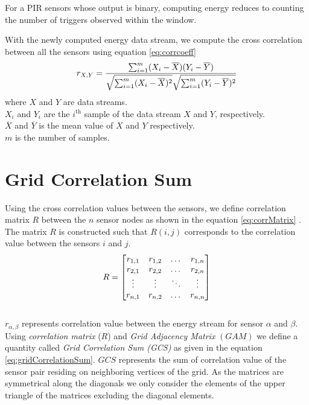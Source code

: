 For a PIR sensors whose output is binary, computing energy reduces to counting the number of triggers observed within the window.

With the newly computed energy data stream, we compute the cross correlation between all the sensors using equation \ref{eq:corrcoeff}
\begin{equation}
\label{eq:corrcoeff}
r_{X,Y}=\frac{\sum_{i=1}^{m}(X_i-\overline{X})(Y_i-\overline{Y})}{\sqrt{\sum_{i=1}^{m}(X_i-\overline{X})^2}\sqrt{\sum_{i=1}^{m}(Y_i-\overline{Y})^2}} \\
\end{equation}
where $X$ and $Y$ are data streams.\\
 $X_i$ and $Y_i$ are the $i^{\mbox{th}}$ sample of the data stream $X$ and $Y$, respectively.\\
$\overline{X}$ and $\overline{Y}$ is the mean value of $X$ and $Y$ respectively.\\
 $m$ is the number of samples.


\section{Grid Correlation Sum}
\label{sec:gcs}
Using the cross correlation values between the sensors, we define correlation matrix $R$ between the $n$ sensor nodes as shown in the equation \ref{eq:corrMatrix} . The matrix $R$ is constructed such that $R(i,j)$ corresponds to the correlation value between the sensors $i$ and $j$.
\begin{equation}
\label{eq:corrMatrix}
\centering
R = 
\begin{bmatrix}
    r_{1,1} & r_{1,2} & \dots  & r_{1,n} \\
    r_{2,1} & r_{2,2}  & \dots  & r_{2,n} \\
    \vdots & \vdots  & \ddots & \vdots \\
    r_{n,1} & r_{n,2}  & \dots  & r_{n,n}
\end{bmatrix}
\end{equation}\\
$r_{\alpha,\beta}$ represents correlation value between the energy stream for sensor $\alpha$ and $\beta$.\\


Using \textit{correlation matrix} ($R$) and \textit{Grid Adjacency Matrix} $(GAM)$ we define a quantity called \textit{Grid Correlation Sum (GCS)} as given in the equation \ref{eq:gridCorrelationSum}. $GCS$ represents the sum of correlation value of the sensor pair residing on neighboring vertices of the grid.
As the matrices are symmetrical along the diagonals we only consider the elements of the upper triangle of the matrices excluding the diagonal elements. 


